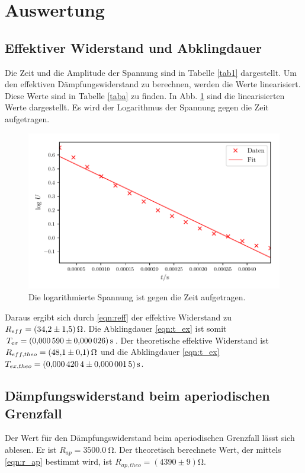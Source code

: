 \section{Auswertung}
\label{sec:Auswertung}

\subsection{Effektiver Widerstand und Abklingdauer} 
Die Zeit und die Amplitude der Spannung sind in Tabelle
\ref{tab1} dargestellt. Um den effektiven Dämpfungswiderstand
zu berechnen, werden die Werte linearisiert. Diese Werte sind in
Tabelle \ref{taba} zu finden. In Abb. \ref{fig:plota}
sind die linearisierten Werte dargestellt. Es wird der
Logarithmus der Spannung gegen die Zeit aufgetragen.


\begin{figure}
  \centering
  \includegraphics{build/plota.pdf}
  \caption{Die logarithmierte Spannung ist gegen die Zeit aufgetragen.} %
  \label{fig:plota}
\end{figure}
\noindent Daraus ergibt sich durch \eqref{eqn:reff} %
der effektive Widerstand zu $R_{eff} = \SI{34.2 \pm 1.5}{\ohm}$.
Die Abklingdauer \ref{eqn:t_ex} ist somit $T_{ex} = \SI{0.000590 \pm 0.000026}{\second}$.
\newline
Der theoretische effektive Widerstand ist $R_{eff,theo} = \SI{48.1 \pm 0.1}{\ohm}$ %
und die Abklingdauer \eqref{eqn:t_ex} $T_{ex,theo} = \SI{0.0004204 \pm 0.0000015}{\second}$. %

\subsection{Dämpfungswiderstand beim aperiodischen Grenzfall}
Der Wert für den Dämpfungswiderstand beim aperiodischen Grenzfall
lässt sich ablesen. Er ist $R_{ap} = \SI{3500.0}{\ohm}$.
\newline
Der theoretisch berechnete Wert, der mittels \eqref{eqn:r_ap}
bestimmt wird, ist $R_{ap,theo} = (4390 \pm 9) \si{\ohm}$.

